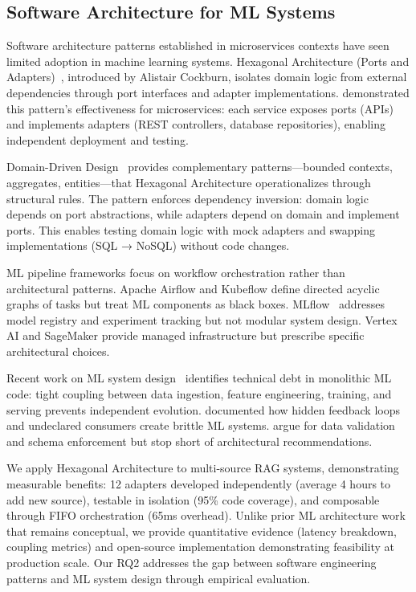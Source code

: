 \documentclass[pdflatex,sn-basic]{sn-jnl}
\begin{document}
\subsection{Software Architecture for ML Systems}
\label{sec:related-architecture}

Software architecture patterns established in microservices contexts have seen limited adoption in machine learning systems. Hexagonal Architecture (Ports and Adapters)~\citep{cockburn2005hexagonal}, introduced by Alistair Cockburn, isolates domain logic from external dependencies through port interfaces and adapter implementations. \cite{richardson2018microservices} demonstrated this pattern's effectiveness for microservices: each service exposes ports (APIs) and implements adapters (REST controllers, database repositories), enabling independent deployment and testing.

Domain-Driven Design~\citep{evans2003ddd} provides complementary patterns—bounded contexts, aggregates, entities—that Hexagonal Architecture operationalizes through structural rules. The pattern enforces dependency inversion: domain logic depends on port abstractions, while adapters depend on domain and implement ports. This enables testing domain logic with mock adapters and swapping implementations (SQL → NoSQL) without code changes.

ML pipeline frameworks focus on workflow orchestration rather than architectural patterns. Apache Airflow and Kubeflow define directed acyclic graphs of tasks but treat ML components as black boxes. MLflow~\citep{chen2020mlflow} addresses model registry and experiment tracking but not modular system design. Vertex AI and SageMaker provide managed infrastructure but prescribe specific architectural choices.

Recent work on ML system design~\citep{paleyes2022mle} identifies technical debt in monolithic ML code: tight coupling between data ingestion, feature engineering, training, and serving prevents independent evolution. \cite{sculley2015debt} documented how hidden feedback loops and undeclared consumers create brittle ML systems. \cite{polyzotis2017mldata} argue for data validation and schema enforcement but stop short of architectural recommendations.

We apply Hexagonal Architecture to multi-source RAG systems, demonstrating measurable benefits: 12 adapters developed independently (average 4 hours to add new source), testable in isolation (95\% code coverage), and composable through FIFO orchestration (65ms overhead). Unlike prior ML architecture work that remains conceptual, we provide quantitative evidence (latency breakdown, coupling metrics) and open-source implementation demonstrating feasibility at production scale. Our RQ2 addresses the gap between software engineering patterns and ML system design through empirical evaluation.
\end{document}

